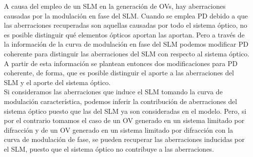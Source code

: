A causa del empleo de un SLM en la generación de OVs, hay aberraciones causadas por la modulación en fase del SLM. Cuando se emplea PD debido a que las aberraciones recuperadas son aquellas causadas por todo el sistema óptico, no es posible distinguir qué elementos ópticos aportan las aportan. Pero a través de la información de la curva de modulación en fase del SLM podemos modificar PD coherente para distinguir las aberraciones del SLM con respecto al sistema óptico. A partir de esta información se plantean entonces dos modificaciones para PD coherente, de forma, que es posible distinguir el aporte a las aberraciones del SLM y el aporte del sistema óptico.\\




Si consideramos las aberraciones que induce el SLM tomando la curva de modulación característica, podemos inferir la contribución de aberraciones del sistema óptico puesto que las del SLM ya son consideradas en el modelo. Pero, si por el contrario tomamos el caso de un OV generado en un sistema limitado por difracción y de un OV generado en un sistema limitado por difracción con la curva de modulación de fase, se pueden recuperar las aberraciones inducidas por el SLM, puesto que el sistema óptico no contribuye a las aberraciones.\\


